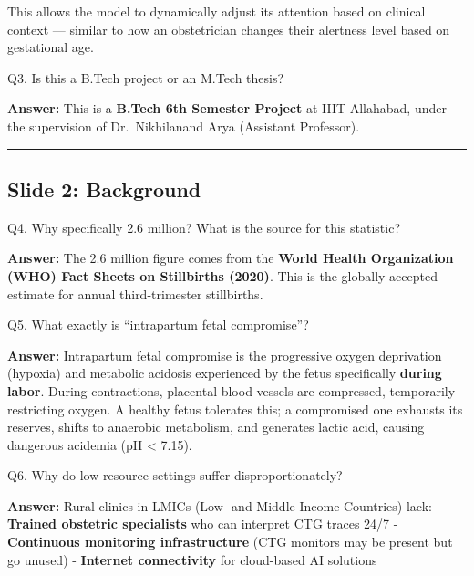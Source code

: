 \documentclass[11pt,a4paper]{article}
\begin{document}
This allows the model to dynamically adjust its attention based on
clinical context --- similar to how an obstetrician changes their
alertness level based on gestational age.

\begin{questionbox}
Q3. Is this a B.Tech project or an M.Tech thesis?
\end{questionbox}
\textbf{Answer:} This is a \textbf{B.Tech 6th Semester Project} at IIIT
Allahabad, under the supervision of Dr.~Nikhilanand Arya (Assistant
Professor).

\begin{center}\rule{0.5\linewidth}{0.5pt}\end{center}

\subsection{Slide 2: Background}\label{slide-2-background}

\begin{questionbox}
Q4. Why specifically 2.6 million? What is the source for this
statistic?
\end{questionbox}
\textbf{Answer:} The 2.6 million figure comes from the \textbf{World Health
Organization (WHO) Fact Sheets on Stillbirths (2020)}. This is the
globally accepted estimate for annual third-trimester stillbirths.

\begin{questionbox}
Q5. What exactly is ``intrapartum fetal compromise''?
\end{questionbox}
\textbf{Answer:} Intrapartum fetal compromise is the progressive oxygen
deprivation (hypoxia) and metabolic acidosis experienced by the fetus
specifically \textbf{during labor}. During contractions, placental blood
vessels are compressed, temporarily restricting oxygen. A healthy fetus
tolerates this; a compromised one exhausts its reserves, shifts to
anaerobic metabolism, and generates lactic acid, causing dangerous
acidemia (pH \textless{} 7.15).

\begin{questionbox}
Q6. Why do low-resource settings suffer disproportionately?
\end{questionbox}
\textbf{Answer:} Rural clinics in LMICs (Low- and Middle-Income Countries)
lack: - \textbf{Trained obstetric specialists} who can interpret CTG
traces 24/7 - \textbf{Continuous monitoring infrastructure} (CTG
monitors may be present but go unused) - \textbf{Internet connectivity}
for cloud-based AI solutions
\end{document}
